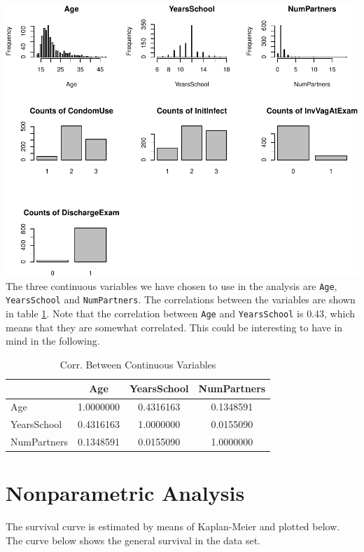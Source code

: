 \documentclass[
]{article}
\begin{document}
\includegraphics{practical_files/figure-latex/EDA-plots-1.pdf}
The three continuous variables we have chosen to use in the analysis are \texttt{Age}, \texttt{YearsSchool} and \texttt{NumPartners}. The correlations between the variables are shown in table \ref{tab:correlations}. Note that the correlation between \texttt{Age} and \texttt{YearsSchool} is 0.43, which means that they are somewhat correlated. This could be interesting to have in mind in the following.

\begin{table}

\caption{\label{tab:correlations}Corr. Between Continuous Variables}
\centering
\begin{tabular}[t]{l|c|c|c}
\hline
  & Age & YearsSchool & NumPartners\\
\hline
Age & 1.0000000 & 0.4316163 & 0.1348591\\
\hline
YearsSchool & 0.4316163 & 1.0000000 & 0.0155090\\
\hline
NumPartners & 0.1348591 & 0.0155090 & 1.0000000\\
\hline
\end{tabular}
\end{table}

\hypertarget{nonparametric-analysis}{%
\section{Nonparametric Analysis}\label{nonparametric-analysis}}

The survival curve is estimated by means of Kaplan-Meier and plotted below. The curve below shows the general survival in the data set.
\end{document}
